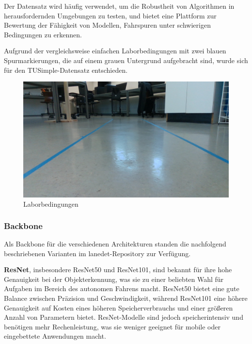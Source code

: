 \documentclass{article}
\begin{document}
                Der Datensatz wird häufig verwendet, um die Robustheit von Algorithmen in herausfordernden Umgebungen zu testen, und bietet eine Plattform zur Bewertung der Fähigkeit von Modellen, Fahrspuren unter schwierigen Bedingungen zu erkennen.
                \cite{Zhao2024StructLane} \cite{Lin2021Semi-Supervised}

                Aufgrund der vergleichsweise einfachen Laborbedingungen mit zwei blauen Spurmarkierungen, die auf einem grauen Untergrund aufgebracht sind, wurde sich für den TUSimple-Datensatz entschieden.

                \begin{figure}[h!]
                    \includegraphics[width=\linewidth]{Laborbedingungen.jpg}
                    \caption{Laborbedingungen}
                    \label{fig:Laborbedingungen}
                \end{figure}


            \subsubsection{Backbone}
                Als Backbone für die verschiedenen Architekturen standen die nachfolgend beschriebenen  Varianten im lanedet-Repository zur Verfügung.

                \textbf{ResNet}, insbesondere ResNet50 und ResNet101, sind bekannt für ihre hohe Genauigkeit bei der Objekterkennung, was sie zu einer beliebten Wahl für Aufgaben im Bereich des autonomen Fahrens macht. ResNet50 bietet eine gute Balance zwischen Präzision und Geschwindigkeit, während ResNet101 eine höhere Genauigkeit auf Kosten eines höheren Speicherverbrauchs und einer größeren Anzahl von Parametern bietet. ResNet-Modelle sind jedoch speicherintensiv und benötigen mehr Rechenleistung, was sie weniger geeignet für mobile oder eingebettete Anwendungen macht.
                \cite{Chen2021Deep}
\end{document}
